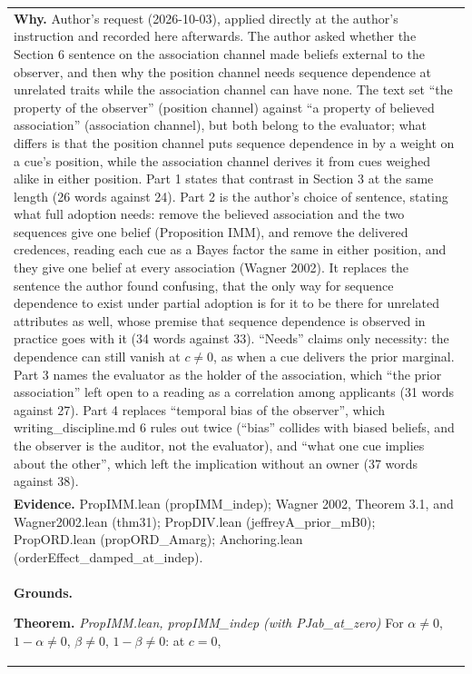 \documentclass[10pt]{article}
\theoremstyle{definition}
\newlength{\fullw}\setlength{\fullw}{25.9cm}
\begin{document}
{\begin{longtable}{|p{0.9cm}|p{12.2cm}|p{12.2cm}|}
\multicolumn{3}{|p{\fullw}|}{\textbf{Why.} Author's request (2026-10-03), applied directly at the author's instruction and recorded here afterwards. The author asked whether the Section 6 sentence on the association channel made beliefs external to the observer, and then why the position channel needs sequence dependence at unrelated traits while the association channel can have none. The text set ``the property of the observer'' (position channel) against ``a property of believed association'' (association channel), but both belong to the evaluator; what differs is that the position channel puts sequence dependence in by a weight on a cue's position, while the association channel derives it from cues weighed alike in either position. Part 1 states that contrast in Section 3 at the same length (26 words against 24). Part 2 is the author's choice of sentence, stating what full adoption needs: remove the believed association and the two sequences give one belief (Proposition IMM), and remove the delivered credences, reading each cue as a Bayes factor the same in either position, and they give one belief at every association (Wagner 2002). It replaces the sentence the author found confusing, that the only way for sequence dependence to exist under partial adoption is for it to be there for unrelated attributes as well, whose premise that sequence dependence is observed in practice goes with it (34 words against 33). ``Needs'' claims only necessity: the dependence can still vanish at $c\neq0$, as when a cue delivers the prior marginal. Part 3 names the evaluator as the holder of the association, which ``the prior association'' left open to a reading as a correlation among applicants (31 words against 27). Part 4 replaces ``temporal bias of the observer'', which writing\_discipline.md 6 rules out twice (``bias'' collides with biased beliefs, and the observer is the auditor, not the evaluator), and ``what one cue implies about the other'', which left the implication without an owner (37 words against 38).} \\
\multicolumn{3}{|p{\fullw}|}{\textbf{Evidence.} PropIMM.lean (propIMM\_indep); Wagner 2002, Theorem 3.1, and Wagner2002.lean (thm31); PropDIV.lean (jeffreyA\_prior\_mB0); PropORD.lean (propORD\_Amarg); Anchoring.lean (orderEffect\_damped\_at\_indep).} \\ \hline
\multicolumn{3}{|p{\fullw}|}{\textbf{Grounds.}\par \textbf{Theorem.} \textit{PropIMM.lean, propIMM\_indep (with PJab\_at\_zero)} \newline For $\alpha\neq0$, $1-\alpha\neq0$, $\beta\neq0$, $1-\beta\neq0$: at $c=0$,
}
\end{longtable}}
\end{document}
